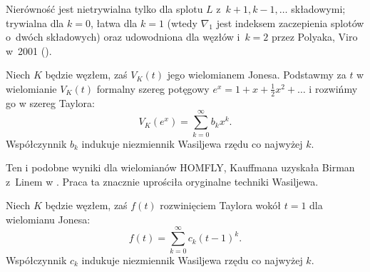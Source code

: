 Nierówność jest nietrywialna tylko dla splotu $L$ z~$k+1, k-1, \ldots$ składowymi; trywialna dla $k = 0$, łatwa dla $k=1$ (wtedy $\nabla_1$ jest indeksem zaczepienia splotów o~dwóch składowych) oraz udowodniona dla węzłów i~$k=2$ przez Polyaka, Viro w~2001 (\cite{polyak01}).

\begin{example}
    Niech $K$ będzie węzłem, zaś $V_K(t)$ jego wielomianem Jonesa.
    Podstawmy za $t$ w wielomianie $V_K(t)$ formalny szereg potęgowy $e^x = 1 + x + \frac12 x^2 + \ldots$ i rozwińmy go w szereg Taylora:
    \begin{equation}
        V_K(e^x) = \sum_{k = 0}^\infty b_k x^k.
    \end{equation}
    Współczynnik $b_{k}$ indukuje niezmiennik Wasiljewa rzędu co najwyżej $k$.
\end{example}

Ten i podobne wyniki dla wielomianów HOMFLY, Kauffmana uzyskała Birman z~Linem w \cite{birman93}.
Praca ta znacznie uprościła oryginalne techniki Wasiljewa.

\begin{example}
    Niech $K$ będzie węzłem, zaś $f(t)$ rozwinięciem Taylora wokół $t = 1$ dla wielomianu Jonesa:
    \begin{equation}
        f(t) = \sum_{k = 0}^\infty c_k (t-1)^k.
    \end{equation}
    Współczynnik $c_{k}$ indukuje niezmiennik Wasiljewa rzędu co najwyżej $k$.
\end{example}


